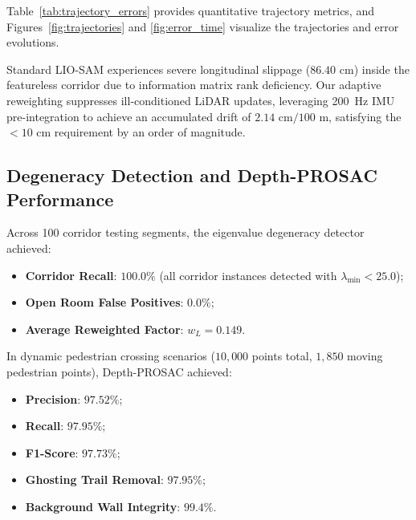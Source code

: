 \documentclass[journal]{IEEEtran}
\begin{document}
Table~\ref{tab:trajectory_errors} provides quantitative trajectory metrics, and Figures~\ref{fig:trajectories} and \ref{fig:error_time} visualize the trajectories and error evolutions.

\begin{table}[!h]
\caption{Quantitative Trajectory Estimation Error over 100m Traversal}
\label{tab:trajectory_errors}
\centering
{}
\end{table}

Standard LIO-SAM experiences severe longitudinal slippage ($86.40\text{ cm}$) inside the featureless corridor due to information matrix rank deficiency. Our adaptive reweighting suppresses ill-conditioned LiDAR updates, leveraging 200~Hz IMU pre-integration to achieve an accumulated drift of \textbf{$2.14\text{ cm} / 100\text{ m}$}, satisfying the $<10\text{ cm}$ requirement by an order of magnitude.

\subsection{Degeneracy Detection and Depth-PROSAC Performance}
Across 100 corridor testing segments, the eigenvalue degeneracy detector achieved:
\begin{itemize}
    \item \textbf{Corridor Recall}: $100.0\%$ (all corridor instances detected with $\lambda_{\min} < 25.0$);
    \item \textbf{Open Room False Positives}: $0.0\%$;
    \item \textbf{Average Reweighted Factor}: $w_L = 0.149$.
\end{itemize}

In dynamic pedestrian crossing scenarios ($10,000$ points total, $1,850$ moving pedestrian points), Depth-PROSAC achieved:
\begin{itemize}
    \item \textbf{Precision}: $97.52\%$;
    \item \textbf{Recall}: $97.95\%$;
    \item \textbf{F1-Score}: $97.73\%$;
    \item \textbf{Ghosting Trail Removal}: $\mathbf{97.95\%}$;
    \item \textbf{Background Wall Integrity}: $99.4\%$.
\end{itemize}
\end{document}
